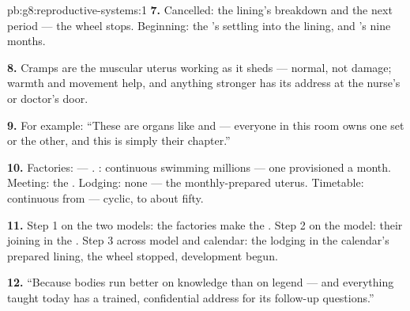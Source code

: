 \begin{solution}{pb:g8:reproductive-systems:1}
\textbf{7.} Cancelled: the lining's breakdown and the next
period --- the wheel stops. Beginning: the 's
settling into the lining, and 's nine months.

\textbf{8.} Cramps are the muscular uterus working as it
sheds --- normal, not damage; warmth and movement help,
and anything stronger has its address at the nurse's or
doctor's door.

\textbf{9.} For example: ``These are organs like  and
 --- everyone in this room owns one set or the other,
and this is simply their chapter.''

\textbf{10.} Factories:  --- . :
continuous swimming millions --- one provisioned  a
month. Meeting: the . Lodging: none --- the
monthly-prepared uterus. Timetable: continuous from
 --- cyclic,  to about fifty.

\textbf{11.} Step 1 on the two models: the factories make
the . Step 2 on the  model: their joining in
the . Step 3 across model and calendar: the 
lodging in the calendar's prepared lining, the wheel
stopped, development begun.

\textbf{12.} ``Because bodies run better on knowledge than
on legend --- and everything taught today has a trained,
confidential address for its follow-up questions.''
\end{solution}
